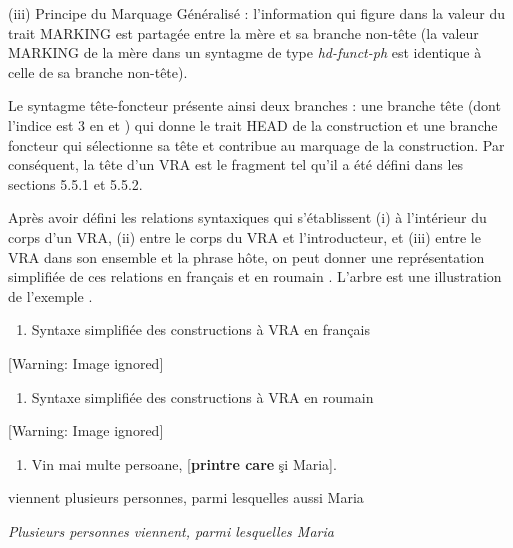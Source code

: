 (iii) Principe du Marquage Généralisé : l'information qui figure dans la valeur du trait MARKING est partagée entre la mère et sa branche non-tête (la valeur MARKING de la mère dans un syntagme de type \textit{hd-funct-ph} est identique à celle de sa branche non-tête).  

Le syntagme tête-foncteur présente ainsi deux branches : une branche tête (dont l'indice est 3 en  et ) qui donne le trait HEAD de la construction et une branche foncteur qui sélectionne sa tête et contribue au marquage de la construction. Par conséquent, la tête d'un VRA est le fragment tel qu'il a été défini dans les sections 5.5.1 et 5.5.2.

Après avoir défini les relations syntaxiques qui s'établissent (i) à l'intérieur du corps d'un VRA, (ii) entre le corps du VRA et l'introducteur, et (iii) entre le VRA dans son ensemble et la phrase hôte, on peut donner une représentation simplifiée de ces relations en français  et en roumain . L'arbre  est une illustration de l'exemple .  


\begin{enumerate}
\item \label{bkm:Ref299109023}Syntaxe simplifiée des constructions à VRA en français  


\end{enumerate}
{   [Warning: Image ignored] %
} 


\begin{enumerate}
\item \label{bkm:Ref299109040}Syntaxe simplifiée des constructions à VRA en roumain  


\end{enumerate}
{   [Warning: Image ignored] %
} 


\begin{enumerate}
\item \label{bkm:Ref299042029}Vin mai multe persoane, [\textbf{printre care} şi Maria].


\end{enumerate}
  viennent plusieurs personnes, parmi lesquelles aussi Maria

  \textit{Plusieurs personnes viennent, parmi lesquelles Maria } 

